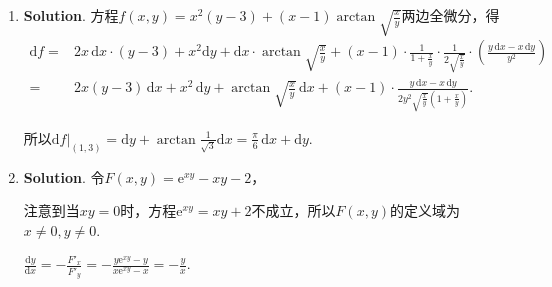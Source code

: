\documentclass[../Main.tex]{subfiles}
\begin{document}
\begin{enumerate}
          消去$z$得$x^{2}+y^{2}+x+y=0$，即$\left(x+\frac{1}{2}\right)^{2}+\left(y+\frac{1}{2}
              \right)^{2}=\frac{1}{2}$.

          令$\begin{cases}
                  x = \frac{\sqrt{2}}{2}\cos \theta-\frac{1}{2}, \\
                  y = \frac{\sqrt{2}}{2}\sin \theta-\frac{1}{2}
              \end{cases}(0\leq \theta < 2\pi)$，则$z=1-x-y=2-\frac{\sqrt{2}}{2}(\cos \theta
              +\sin \theta)=2-\sin\left(\theta+\frac{\pi}{4}\right)$.

          因此交线的参数方程为$\begin{cases}
                  x = \frac{\sqrt{2}}{2}\cos \theta-\frac{1}{2}, \\
                  y = \frac{\sqrt{2}}{2}\sin \theta-\frac{1}{2}, \\
                  z = 2-\sin\left(\theta+\frac{\pi}{4}\right)
              \end{cases}(0\leq \theta < 2\pi)$.

    \item \textbf{Solution}. 方程$f(x,y) = x^{2}(y-3)+(x-1)\arctan\sqrt{\frac{x}{y}}$两边全微分，得
          \[
              \begin{aligned}
                  \mathrm{d}f = & 2x\,\mathrm{d}x\cdot (y-3) +x^{2} \mathrm{d}y +\mathrm{d}x\cdot \arctan\sqrt{\frac{x}{y}}+(x-1)\cdot\frac{1}{1+\frac{x}{y}}\cdot \frac{1}{2\sqrt{\frac{x}{y}}}\cdot\left(\frac{y\,\mathrm{d}x-x\,\mathrm{d}y}{y^2}\right) \\
                  =             & 2x(y-3)\,\mathrm{d}x +x^{2}\,\mathrm{d}y+\arctan\sqrt{\frac{x}{y}}\,\mathrm{d}x+(x-1)\cdot\frac{y\,\mathrm{d}x-x\,\mathrm{d}y}{2y^2\sqrt{\frac{x}{y}}\left(1+\frac{x}{y}\right)}.
              \end{aligned}
          \]

          所以$\left.\mathrm{d}f\right|_{(1,3)}=\mathrm{d}y + \arctan\frac{1}{\sqrt{3}}
              \mathrm{d}x = \frac{\pi}{6}\,\mathrm{d}x + \mathrm{d}y$.

    \item \textbf{Solution}. 令$F(x,y) = \mathrm{e}^{xy}-xy-2$，

          注意到当$xy = 0$时，方程$\mathrm{e}^{xy}= xy+2$不成立，所以$F(x,y)$的定义域为$x
              \neq0,y\neq0$.

          $\frac{\mathrm{d}y}{\mathrm{d}x}=-\frac{F'_{x}}{F'_{y}}=-\frac{y\mathrm{e}^{xy}-y}{x\mathrm{e}^{xy}-x}
              =-\frac{y}{x}$.


\end{enumerate}
\end{document}
